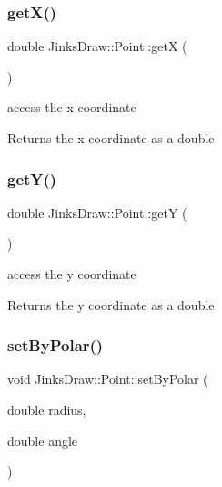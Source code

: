 \subsubsection{\texorpdfstring{get\+X()}{getX()}}
{\footnotesize\ttfamily double Jinks\+Draw\+::\+Point\+::getX (\begin{DoxyParamCaption}{ }\end{DoxyParamCaption})}



access the x coordinate 

\begin{DoxyReturn}{Returns}
the x coordinate as a double 
\end{DoxyReturn}
\mbox{\label{class_jinks_draw_1_1_point_a3dcffb5d490aa4c17a6d468b944fc590}} 
\subsubsection{\texorpdfstring{get\+Y()}{getY()}}
{\footnotesize\ttfamily double Jinks\+Draw\+::\+Point\+::getY (\begin{DoxyParamCaption}{ }\end{DoxyParamCaption})}



access the y coordinate 

\begin{DoxyReturn}{Returns}
the y coordinate as a double 
\end{DoxyReturn}
\mbox{\label{class_jinks_draw_1_1_point_a8dad65ea830fc616d2c1fdddf2809cb0}} 
\subsubsection{\texorpdfstring{set\+By\+Polar()}{setByPolar()}}
{\footnotesize\ttfamily void Jinks\+Draw\+::\+Point\+::set\+By\+Polar (\begin{DoxyParamCaption}\item[{double}]{radius,  }\item[{double}]{angle }\end{DoxyParamCaption})}



